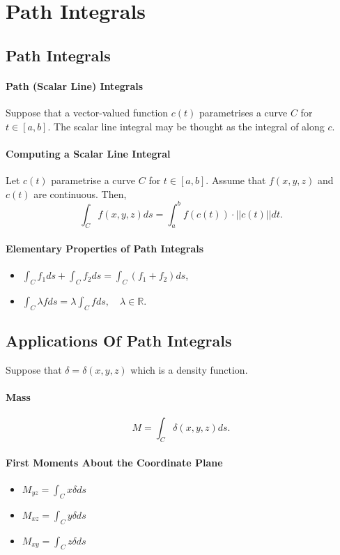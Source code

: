 \section{Path Integrals}

\subsection{Path Integrals}


\paragraph{Path (Scalar Line) Integrals}
Suppose that a vector-valued function \(c(t)\) parametrises a 
curve \(C\) for \(t\in [a, b]\).
The scalar line integral may be thought as the integral of along \(c\).

\paragraph{Computing a Scalar Line Integral}
Let \(c(t)\) parametrise a curve \(C\) for \(t\in [a, b]\).
Assume that \(f(x, y, z)\) and \(c(t)\) are continuous.
Then,
\[
    \int_{C} f(x, y, z) ds
    =
    \int_{a}^{b} f\left(c\left(t\right)\right) \cdot ||c(t)|| dt.
\]

\paragraph{Elementary Properties of Path Integrals}
\begin{itemize}
    \item \(\int_C f_1 ds + \int_C f_2 ds = \int_C(f_1+f_2)ds\),
    \item \(\int_C\lambda f ds = \lambda \int_C f ds, \quad
    \lambda\in \mathbb{R}\).
\end{itemize}

\subsection{Applications Of Path Integrals}
Suppose that \(\delta = \delta(x, y, z)\) which is a density function.

\paragraph{Mass}
\[M = \int_C \delta(x, y, z) ds.\]

\paragraph{First Moments About the Coordinate Plane}
\begin{itemize}
    \item \(M_{yz} = \int_C x \delta ds\)
    \item \(M_{xz} = \int_C y \delta ds\)
    \item \(M_{xy} = \int_C z \delta ds\)
\end{itemize}

